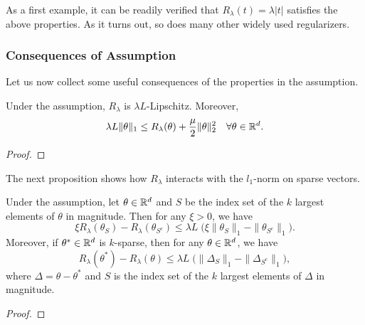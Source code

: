 As a first example,
it can be readily verified that $R_\lambda(t)=\lambda|t|$
satisfies the above properties.
As it turns out,
so does many other widely used regularizers.

\begin{ex}
\todo
\end{ex}

\begin{ex}
\todo
\end{ex}

\subsubsection{Consequences of Assumption}

Let us now collect some useful consequences of the properties in the assumption.
\begin{pro}
Under the assumption,
$R_\lambda$ is $\lambda L$-Lipschitz.
Moreover,
\begin{equation}
    \lambda L\|\theta\|_1\le R_\lambda(\theta)+\frac{\mu}{2}\|\theta\|_2^2\quad
    \forall\theta\in{\mathbb{R}}^d.
\end{equation}
\end{pro}
\begin{proof}
\todo
\end{proof}

The next proposition shows how $R_\lambda$ interacts with the $l_1$-norm
on sparse vectors.
\begin{pro}
Under the assumption,
let $\theta\in{\mathbb{R}}^d$ and $S$ be the index set of the $k$ largest elements
of $\theta$ in magnitude.
Then for any $\xi>0$,
we have
\begin{equation}
    \xi R_\lambda(\theta_S)-R_\lambda(\theta_{S^c})\le
        \lambda L\;\big(\xi\|\theta_S\|_1-\|\theta_{S^c}\|_1\big).
\end{equation}
Moreover,
if $\theta^*\in{\mathbb{R}}^d$ is $k$-sparse,
then for any $\theta\in{\mathbb{R}}^d$,
we have
\begin{equation}
    R_\lambda(\theta^*)-R_\lambda(\theta)\le
        \lambda L\;\big(\|\Delta_S\|_1-\|\Delta_{S^c}\|_1\big),
\end{equation}
where $\Delta=\theta-\theta^*$ and $S$ is the index set of the $k$
largest elements of $\Delta$ in magnitude.
\end{pro}
\begin{proof}
\todo
\end{proof}

